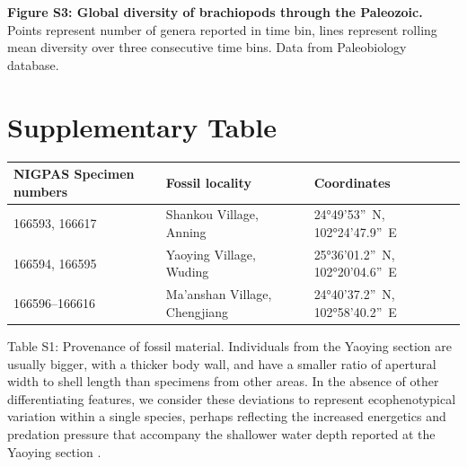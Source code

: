 \documentclass[openany]{book}
\theoremstyle{definition}
\theoremstyle{definition}
\theoremstyle{definition}
\theoremstyle{remark}
\begin{document}
\textbf{Figure S3: Global diversity of brachiopods through the
Paleozoic.} Points represent number of genera reported in time bin,
lines represent rolling mean diversity over three consecutive time bins.
Data from Paleobiology database.

\hypertarget{table}{%
\chapter{Supplementary Table}\label{table}}

\begin{longtable}[]{@{}lll@{}}
\toprule
NIGPAS Specimen numbers & Fossil locality & Coordinates\tabularnewline
\midrule
\endhead
166593, 166617 & Shankou Village, Anning & 24°49'53''~N,
102°24'47.9''~E\tabularnewline
166594, 166595 & Yaoying Village, Wuding & 25°36'01.2''~N,
102°20'04.6''~E\tabularnewline
166596--166616 & Ma'anshan Village, Chengjiang & 24°40'37.2''~N,
102°58'40.2''~E\tabularnewline
\bottomrule
\end{longtable}

Table S1: Provenance of fossil material. Individuals from the Yaoying
section are usually bigger, with a thicker body wall, and have a smaller
ratio of apertural width to shell length than specimens from other
areas. In the absence of other differentiating features, we consider
these deviations to represent ecophenotypical variation within a single
species, perhaps reflecting the increased energetics and predation
pressure that accompany the shallower water depth reported at the
Yaoying section \citep{Zhao2012}.


\end{document}
